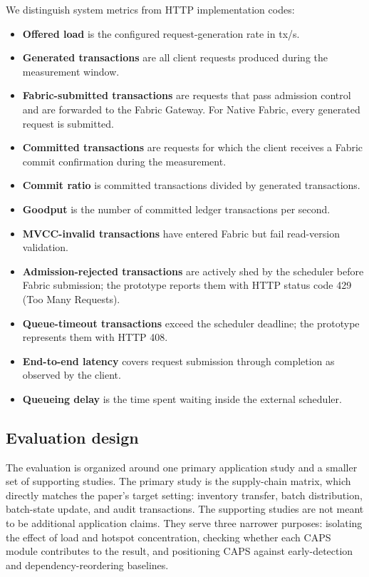 \documentclass[fleqn,10pt,lineno]{wlpeerj}
\begin{document}
We distinguish system metrics from HTTP implementation codes:

\begin{itemize}[noitemsep]
  \item \textbf{Offered load} is the configured request-generation rate in tx/s.
  \item \textbf{Generated transactions} are all client requests produced during the measurement window.
  \item \textbf{Fabric-submitted transactions} are requests that pass admission control and are forwarded to the Fabric Gateway. For Native Fabric, every generated request is submitted.
  \item \textbf{Committed transactions} are requests for which the client receives a Fabric commit confirmation during the measurement.
  \item \textbf{Commit ratio} is committed transactions divided by generated transactions.
  \item \textbf{Goodput} is the number of committed ledger transactions per second.
  \item \textbf{MVCC-invalid transactions} have entered Fabric but fail read-version validation.
  \item \textbf{Admission-rejected transactions} are actively shed by the scheduler before Fabric submission; the prototype reports them with HTTP status code 429 (Too Many Requests).
  \item \textbf{Queue-timeout transactions} exceed the scheduler deadline; the prototype represents them with HTTP 408.
  \item \textbf{End-to-end latency} covers request submission through completion as observed by the client.
  \item \textbf{Queueing delay} is the time spent waiting inside the external scheduler.
\end{itemize}

\subsection*{Evaluation design}

The evaluation is organized around one primary application study and a smaller set of supporting studies. The primary study is the supply-chain matrix, which directly matches the paper's target setting: inventory transfer, batch distribution, batch-state update, and audit transactions. The supporting studies are not meant to be additional application claims. They serve three narrower purposes: isolating the effect of load and hotspot concentration, checking whether each CAPS module contributes to the result, and positioning CAPS against early-detection and dependency-reordering baselines.
\end{document}
